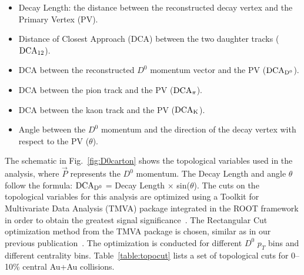 \documentclass[%
 reprint,	
showpacs,
 amsmath,amssymb,
 aps,
 prc,
]{revtex4-1}
\begin{document}
 \begin{itemize} 
  \item Decay Length: the distance between the reconstructed decay vertex and the Primary Vertex (PV).
  \item Distance of Closest Approach (DCA) between the two daughter tracks ($\rm{DCA_{12}}$).
  \item DCA between the reconstructed $D^0$ momentum vector and the PV ($\rm{DCA_{D^{0}}}$).
  \item DCA between the pion track and the PV ($\rm{DCA_{\pi}}$).
  \item DCA between the kaon track and the PV ($\rm{DCA_{K}}$).
  \item Angle between the $D^0$ momentum and the direction of the decay vertex with respect to the PV ($\theta$).
 \end{itemize} 

The schematic in Fig.~\ref{fig:D0carton} shows the topological variables used in the analysis, where $\vec{P}$ represents the $D^0$ momentum. The Decay Length and angle $\theta$ follow the formula: $\rm DCA_{D^{0}}$ = Decay Length $\times$ sin($\theta$). The cuts on the topological variables for this analysis are optimized using a Toolkit for Multivariate Data Analysis (TMVA) package integrated in the ROOT framework in order to obtain the greatest signal significance~\cite{TMVA}. The Rectangular Cut optimization method from the TMVA package is chosen, similar as in our previous publication~\cite{Star_D_v2}. The optimization is conducted for different $D^0$ $p_{T}$ bins and different centrality bins. Table~\ref{table:topocut} lists a set of topological cuts for 0--10\% central Au+Au collisions.
\end{document}
